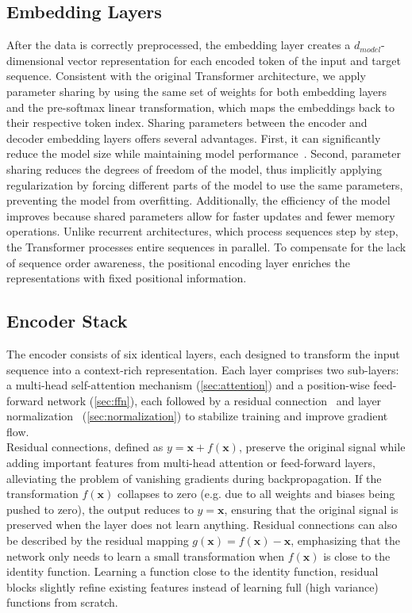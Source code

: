 \subsection{Embedding Layers} 
After the data is correctly preprocessed, the embedding layer creates a \texttt{$d_{model}$}-dimensional vector representation for each encoded token of the input and target sequence. 
Consistent with the original Transformer architecture, we apply parameter sharing by using the same set of weights for both embedding layers and the pre-softmax linear transformation, which maps the embeddings back to their respective token index.
Sharing parameters between the encoder and decoder embedding layers offers several advantages.
First, it can significantly reduce the model size while maintaining model performance~\cite{press2017usingoutputembeddingimprove}.
Second, parameter sharing reduces the degrees of freedom of the model, thus implicitly applying regularization by forcing different parts of the model to use the same parameters, preventing the model from overfitting.
Additionally, the efficiency of the model improves because shared parameters allow for faster updates and fewer memory operations.
Unlike recurrent architectures, which process sequences step by step, the Transformer processes entire sequences in parallel. 
To compensate for the lack of sequence order awareness, the positional encoding layer enriches the representations with fixed positional information.

\subsection{Encoder Stack} 
The encoder consists of six identical layers, each designed to transform the input sequence into a context-rich representation.
Each layer comprises two sub-layers: a multi-head self-attention mechanism (\cref{sec:attention}) and a position-wise feed-forward network (\cref{sec:ffn}), each followed by a residual connection~\cite{he2015deepresiduallearningimage} and layer normalization~\cite{ba2016layernormalization} (\cref{sec:normalization}) to stabilize training and improve gradient flow.\\
Residual connections, defined as  \(y = \mathbf{x} + f(\mathbf{x})\), preserve the original signal while adding important features from multi-head attention or feed-forward layers, alleviating the problem of vanishing gradients during backpropagation.
If the transformation \(f(\mathbf{x})\) collapses to zero (e.g. due to all weights and biases being pushed to zero), the output reduces to \(y = \mathbf{x}\), ensuring that the original signal is preserved when the layer does not learn anything.
Residual connections can also be described by the residual mapping \(g(\mathbf{x}) = f(\mathbf{x}) - \mathbf{x}\), emphasizing that the network only needs to learn a small transformation when \(f(\mathbf{x})\) is close to the identity function.
Learning a function close to the identity function, residual blocks slightly refine existing features instead of learning full (high variance) functions from scratch. \\

